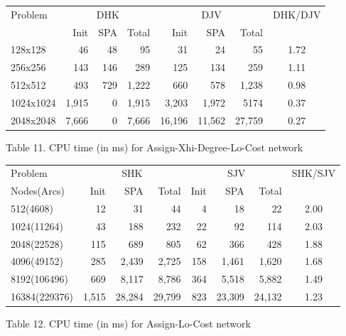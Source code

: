 \vskip 5pt
{\small
\begin{tabular}{|l|rrr|rrr|c|} \hline
 Problem & \multicolumn{3}{c|}{DHK}& \multicolumn{3}{c|}{DJV}&\multicolumn{1}{c|}{DHK/DJV}\\
&Init &SPA &Total &Init &SPA &Total&\\ \hline
128x128&  46& 48& 95&          31& 24& 55& 1.72 \\ 
256x256&  143& 146& 289&       125& 134& 259& 1.11 \\ 
512x512&  493& 729& 1,222&     660& 578& 1,238& 0.98 \\ 
1024x1024&  1,915& 0& 1,915&  3,203& 1,972& 5174& 0.37 \\ 
2048x2048&  7,666& 0& 7,666&  16,196& 11,562& 27,759& 0.27 \\ \hline
\end{tabular}
}

\vskip 2pt
{Table 11. CPU time (in ms) for Assign-Xhi-Degree-Lo-Cost network}
\vskip 5pt

\vskip 5pt
{\small
\begin{tabular}{|l|rrr|rrr|c|} \hline
 Problem & \multicolumn{3}{c|}{SHK}& \multicolumn{3}{c|}{SJV}&\multicolumn{1}{c|}{SHK/SJV}\\
Nodes(Arcs)&Init &SPA &Total &Init &SPA &Total&\\ \hline
512(4608)& 12& 31& 44&         4& 18& 22& 2.00\\ 
1024(11264)& 43& 188& 232&       22& 92& 114& 2.03\\ 
2048(22528)& 115& 689& 805&           62& 366& 428& 1.88\\ 
4096(49152)& 285& 2,439& 2,725&       158& 1,461& 1,620& 1.68\\ 
8192(106496)& 669& 8,117& 8,786&      364& 5,518& 5,882& 1.49\\ 
16384(229376)& 1,515& 28,284& 29,799& 823& 23,309& 24,132& 1.23\\ \hline
\end{tabular}
}

\vskip 2pt
{Table 12. CPU time (in ms) for Assign-Lo-Cost network}
\vskip 5pt

